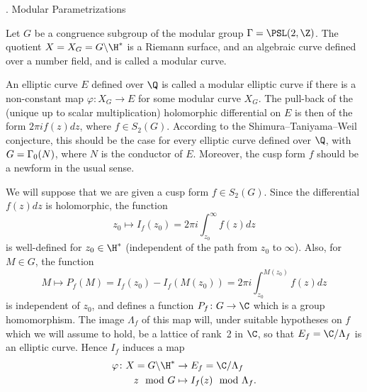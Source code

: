 \goodbreak
\beginsubsection{\modparams}
\subhead \modparams. Modular Parametrizations
\endsubhead
\nobreak

Let $G$ be a congruence subgroup of the modular group
$\Gamma=\PSL(2,\Z)$.  The quotient $X=X_{G}=G\backslash\H^*$ is a
Riemann surface, and an algebraic curve defined over a number field,
and is called a modular curve.

An elliptic curve $E$ defined over $\Q$ is called a modular elliptic
curve if there is a non-constant map $\varphi\colon X_G\to E$ for some
modular curve $X_G$.  The pull-back of the (unique up to scalar
multiplication) holomorphic differential on $E$ is then of the form
$2\pi if(z)dz$, where $f\in S_2(G)$.  According to the
Shimura--Taniyama--Weil conjecture, this should be the case for every
elliptic curve defined over $\Q$, with $G=\G0(N)$, where $N$ is the
conductor of $E$.  Moreover, the cusp form $f$ should be a newform in
the usual sense.

We will suppose that we are given a cusp form $f\in S_2(G)$.  Since
the differential $f(z)dz$ is holomorphic, the function
$$ 
  z_0 \mapsto I_f(z_0) = 2\pi i\int_{z_0}^{\infty}f(z)dz
$$ 
is well-defined for $z_0\in\H^*$ (independent of the path from
$z_0$ to $\infty$).  Also, for $M\in G$, the function
$$
 M \mapsto P_f(M)=I_f(z_0)-I_f(M(z_0))=2\pi i\int_{z_0}^{M(z_0)}f(z)dz 
$$ 
is independent of $z_0$, and defines a function $P_f\colon G \to\C$
which is a group homomorphism.  The image $\Lambda_f$ of this map
will, under suitable hypotheses on $f$ which we will assume to hold,
be a lattice of rank~2 in $\C$, so that $E_f=\C/\Lambda_f$ is an
elliptic curve.  Hence $I_f$ induces a map
$$
  \aligned
 \varphi\colon X=G\backslash\H^* &\to     E_f=\C/\Lambda_f \\
                         z\mod G &\mapsto I_f(z)\mod\Lambda_f.  
  \endaligned
$$


